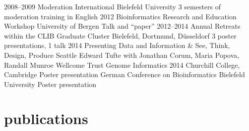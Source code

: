 \documentclass[]{friggeri-cv}
\begin{document}
\begin{entrylist}
\entry
{2008--2009}
{Moderation International}
{Bielefeld University}
{3 semesters of moderation training in English}
\entry
{2012}
{Bioinformatics Research and Education Workshop}
{University of Bergen}
{Talk and ``paper''}
\entry
{2012--2014}
{Annual Retreats {\normalfont within the CLIB Graduate Cluster}}
{Bielefeld, Dortmund, Düsseldorf}
{3 poster presentations, 1 talk}
\entry
{2014}
{Presenting Data and Information \& See, Think, Design, Produce}
{Seattle}
{Edward Tufte with Jonathan Corum, Maria Popova, Randall Munroe}
\entry
{}
{Wellcome Trust Genome Informatics 2014}
{Churchill College, Cambridge}
{Poster presentation}
\entry
{}
{German Conference on Bioinformatics}
{Bielefeld University}
{Poster presentation}
\end{entrylist}


\section{publications}
\end{document}
